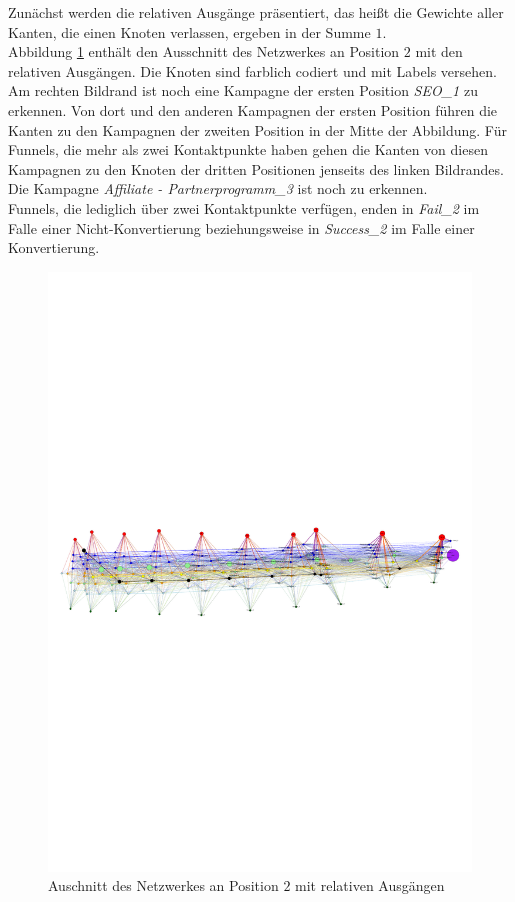 Zunächst werden die relativen Ausgänge präsentiert, das heißt die Gewichte aller Kanten, die einen Knoten verlassen, ergeben in der Summe $1$.\\
Abbildung \ref{out_labels} enthält den Ausschnitt des Netzwerkes an Position $2$ mit den relativen Ausgängen. Die Knoten sind farblich codiert und mit Labels versehen. Am rechten Bildrand ist noch eine Kampagne der ersten Position \textit{SEO\_1} zu erkennen. Von dort und den anderen Kampagnen der ersten Position führen die Kanten zu den Kampagnen der zweiten Position in der Mitte der Abbildung. Für Funnels, die mehr als zwei Kontaktpunkte haben gehen die Kanten von diesen Kampagnen zu den Knoten der dritten Positionen jenseits des linken Bildrandes. Die Kampagne \textit{Affiliate - Partnerprogramm\_3} ist noch zu erkennen.\\
Funnels, die lediglich über zwei Kontaktpunkte verfügen, enden in \textit{Fail\_2} im Falle einer Nicht-Konvertierung beziehungsweise in \textit{Success\_2} im Falle einer Konvertierung.
\begin{figure}[H]
	\centering\includegraphics[scale=2.3]{out_labels.pdf}\caption[Relative Ausgänge]{Auschnitt des Netzwerkes an Position $2$ mit relativen Ausgängen}\label{out_labels}
\end{figure}
